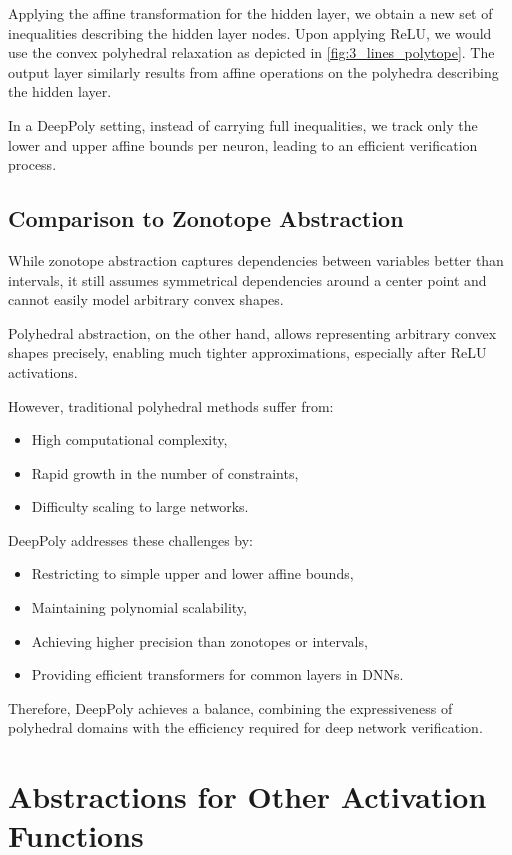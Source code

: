 \documentclass[oneside,11pt,dvipsnames]{book}
\numberwithin{equation}{section}
\theoremstyle{definition}
\theoremstyle{remark}
\begin{document}
Applying the affine transformation for the hidden layer, we obtain a new set of inequalities describing the hidden layer nodes. Upon applying ReLU, we would use the convex polyhedral relaxation as depicted in \autoref{fig:3_lines_polytope}. The output layer similarly results from affine operations on the polyhedra describing the hidden layer.

In a DeepPoly setting, instead of carrying full inequalities, we track only the lower and upper affine bounds per neuron, leading to an efficient verification process.

\subsection{Comparison to Zonotope Abstraction}

While zonotope abstraction captures dependencies between variables better than intervals, it still assumes symmetrical dependencies around a center point and cannot easily model arbitrary convex shapes.

Polyhedral abstraction, on the other hand, allows representing arbitrary convex shapes precisely, enabling much tighter approximations, especially after ReLU activations.

However, traditional polyhedral methods suffer from:
\begin{itemize}
    \item High computational complexity,
    \item Rapid growth in the number of constraints,
    \item Difficulty scaling to large networks.
\end{itemize}

DeepPoly addresses these challenges by:
\begin{itemize}
    \item Restricting to simple upper and lower affine bounds,
    \item Maintaining polynomial scalability,
    \item Achieving higher precision than zonotopes or intervals,
    \item Providing efficient transformers for common layers in DNNs.
\end{itemize}

Therefore, DeepPoly achieves a balance, combining the expressiveness of polyhedral domains with the efficiency required for deep network verification.


\section{Abstractions for Other Activation Functions}
\end{document}
